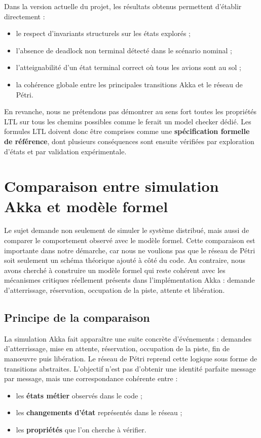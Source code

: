 \documentclass[11pt,a4paper]{article}
\begin{document}
Dans la version actuelle du projet, les résultats obtenus permettent d'établir directement :
\begin{itemize}
    \item le respect d'invariants structurels sur les états explorés ;
    \item l'absence de deadlock non terminal détecté dans le scénario nominal ;
    \item l'atteignabilité d'un état terminal correct où tous les avions sont au sol ;
    \item la cohérence globale entre les principales transitions Akka et le réseau de Pétri.
\end{itemize}

En revanche, nous ne prétendons pas démontrer au sens fort toutes les propriétés LTL sur tous les chemins possibles comme le ferait un model checker dédié. Les formules LTL doivent donc être comprises comme une \textbf{spécification formelle de référence}, dont plusieurs conséquences sont ensuite vérifiées par exploration d'états et par validation expérimentale.

\section{Comparaison entre simulation Akka et modèle formel}

Le sujet demande non seulement de simuler le système distribué, mais aussi de comparer le comportement observé avec le modèle formel. Cette comparaison est importante dans notre démarche, car nous ne voulions pas que le réseau de Pétri soit seulement un schéma théorique ajouté à côté du code. Au contraire, nous avons cherché à construire un modèle formel qui reste cohérent avec les mécanismes critiques réellement présents dans l'implémentation Akka : demande d'atterrissage, réservation, occupation de la piste, attente et libération.

\subsection{Principe de la comparaison}

La simulation Akka fait apparaître une suite concrète d'événements : demandes d'atterrissage, mise en attente, réservation, occupation de la piste, fin de manœuvre puis libération. Le réseau de Pétri reprend cette logique sous forme de transitions abstraites. L'objectif n'est pas d'obtenir une identité parfaite message par message, mais une correspondance cohérente entre :
\begin{itemize}
    \item les \textbf{états métier} observés dans le code ;
    \item les \textbf{changements d'état} représentés dans le réseau ;
    \item les \textbf{propriétés} que l'on cherche à vérifier.
\end{itemize}
\end{document}
